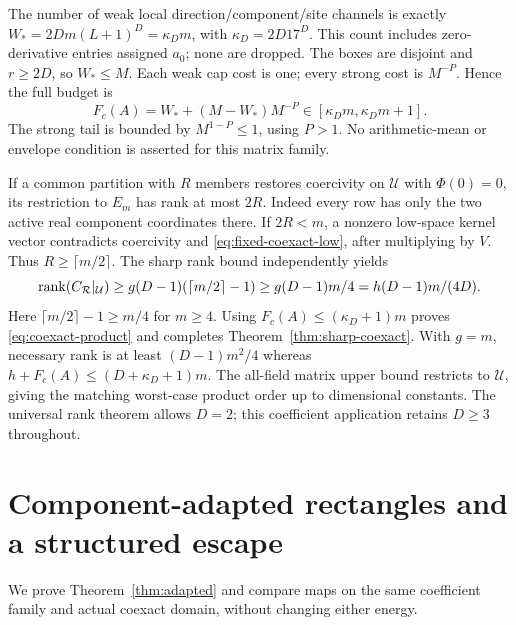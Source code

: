 The number of weak local direction/component/site channels is exactly
$W_*=2Dm(L+1)^D=\kappa_Dm$, with $\kappa_D=2D17^D$.
This count includes zero-derivative entries assigned $a_0$; none are dropped.
The boxes are disjoint and $r\ge2D$, so $W_*\le M$.
Each weak cap cost is one; every strong cost is $M^{-P}$. Hence the full budget is
\begin{equation}\label{eq:fixed-coexact-budget}
 F_c(A)=W_*+(M-W_*)M^{-P}\in[\kappa_Dm,\kappa_Dm+1].
\end{equation}
The strong tail is bounded by $M^{1-P}\le1$, using $P>1$.
No arithmetic-mean or envelope condition is asserted for this matrix family.

If a common partition with $R$ members restores coercivity on $\mathcal U$
with $\Phi(0)=0$, its restriction to $E_m$ has rank at most $2R$.
Indeed every row has only the two active real component coordinates there.
If $2R<m$, a nonzero low-space kernel vector contradicts coercivity and
\eqref{eq:fixed-coexact-low}, after multiplying by $V$.
Thus $R\ge\lceil m/2\rceil$. The sharp rank bound independently yields
\[
 \operatorname{rank}(C_{\mathcal R}|_{\mathcal U})
 \ge g(D-1)(\lceil m/2\rceil-1)
 \ge g(D-1)m/4= h(D-1)m/(4D).
\]
Here $\lceil m/2\rceil-1\ge m/4$ for $m\ge4$.
Using $F_c(A)\le(\kappa_D+1)m$ proves \eqref{eq:coexact-product} and
completes Theorem~\ref{thm:sharp-coexact}. With $g=m$, necessary rank is
at least $(D-1)m^2/4$ whereas $h+F_c(A)\le(D+\kappa_D+1)m$.
The all-field matrix upper bound restricts to $\mathcal U$, giving the
matching worst-case product order up to dimensional constants.
The universal rank theorem allows $D=2$; this coefficient application
retains $D\ge3$ throughout.

\section{Component-adapted rectangles and a structured escape}\label{sec:adapted}
We prove Theorem~\ref{thm:adapted} and compare maps on the same coefficient
family and actual coexact domain, without changing either energy.

